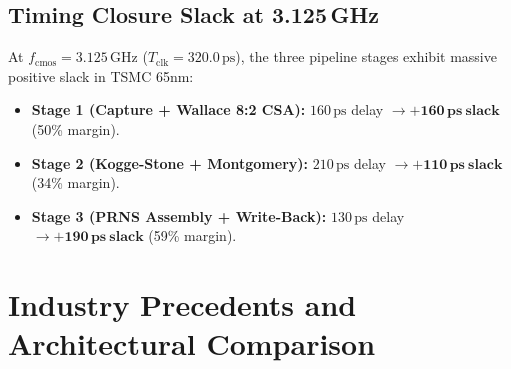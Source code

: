 \documentclass[10pt,journal,compsoc]{IEEEtran}
\begin{document}
\begin{table}[t]
\caption{Full-System Electrical Power Budget (Mini 16-Tile)}
\label{tab:power}
\centering
{}
\end{table}

\subsection{Timing Closure Slack at 3.125\,GHz}
At $f_{\text{cmos}} = 3.125\,\text{GHz}$ ($T_{\text{clk}} = 320.0\,\text{ps}$), the three pipeline stages exhibit massive positive slack in TSMC 65nm:
\begin{itemize}
    \item \textbf{Stage 1 (Capture + Wallace 8:2 CSA):} $160\,\text{ps}$ delay $\to \mathbf{+160\,\text{ps}\ \text{slack}}$ (50\% margin).
    \item \textbf{Stage 2 (Kogge-Stone + Montgomery):} $210\,\text{ps}$ delay $\to \mathbf{+110\,\text{ps}\ \text{slack}}$ (34\% margin).
    \item \textbf{Stage 3 (PRNS Assembly + Write-Back):} $130\,\text{ps}$ delay $\to \mathbf{+190\,\text{ps}\ \text{slack}}$ (59\% margin).
\end{itemize}

\section{Industry Precedents and Architectural Comparison}\label{sec:precedents}
\end{document}
